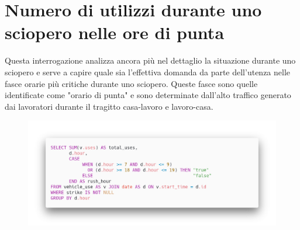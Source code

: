 \section{Numero di utilizzi durante uno sciopero nelle ore di punta}
Questa interrogazione analizza ancora più nel dettaglio la situazione durante
uno sciopero e serve a capire quale sia l'effettiva domanda
da parte dell'utenza nelle fasce orarie più critiche durante uno sciopero.
Queste fasce sono quelle identificate come "orario di punta" e sono 
determinate dall'alto traffico generato dai lavoratori durante il tragitto casa-lavoro e lavoro-casa.
\begin{figure}[H]                                                                                                                                                            
\centering                                                                                                                                                                   
\includegraphics[width=\textwidth]{images/query5}                                                                                                                                   
\label{fig:query5}                                                                                                                                                           
\end{figure}

